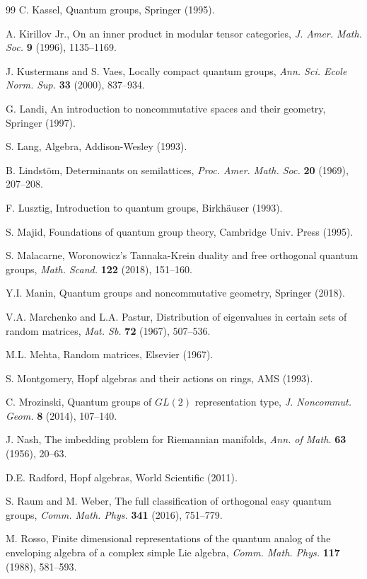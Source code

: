 \documentclass[12pt]{amsbook}
\begin{document}
\begin{thebibliography}{99}
C. Kassel, Quantum groups, Springer (1995).

A. Kirillov Jr., On an inner product in modular tensor categories, {\em J. Amer. Math. Soc.} {\bf 9} (1996), 1135--1169.

J. Kustermans and S. Vaes, Locally compact quantum groups, {\em Ann. Sci. Ecole Norm. Sup.} {\bf 33} (2000), 837--934.

G. Landi, An introduction to noncommutative spaces and their geometry, Springer (1997).

S. Lang, Algebra, Addison-Wesley (1993).

B. Lindst\"om, Determinants on semilattices, {\em Proc. Amer. Math. Soc.} {\bf 20} (1969), 207--208.

F. Lusztig, Introduction to quantum groups, Birkh\"auser (1993).

S. Majid, Foundations of quantum group theory, Cambridge Univ. Press (1995).

S. Malacarne, Woronowicz's Tannaka-Krein duality and free orthogonal quantum groups, {\em Math. Scand.} {\bf 122} (2018), 151--160.

Y.I. Manin, Quantum groups and noncommutative geometry, Springer (2018). 

V.A. Marchenko and L.A. Pastur, Distribution of eigenvalues in certain sets of random matrices, {\em Mat. Sb.} {\bf 72} (1967), 507--536.

M.L. Mehta, Random matrices, Elsevier (1967).

S. Montgomery, Hopf algebras and their actions on rings, AMS (1993).

C. Mrozinski, Quantum groups of $GL(2)$ representation type, {\em J. Noncommut. Geom.} {\bf 8} (2014), 107--140. 

J. Nash, The imbedding problem for Riemannian manifolds, {\em Ann. of Math.} {\bf 63} (1956), 20--63.

D.E. Radford, Hopf algebras, World Scientific (2011).

S. Raum and M. Weber, The full classification of orthogonal easy quantum groups, {\em Comm. Math. Phys.} {\bf 341} (2016), 751--779.

M. Rosso, Finite dimensional representations of the quantum analog of the enveloping algebra of a complex simple Lie algebra, {\em Comm. Math. Phys.} {\bf 117} (1988), 581--593.


\end{thebibliography}
\end{document}

